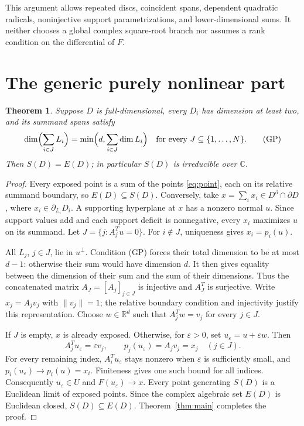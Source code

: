\documentclass[11pt]{article}
\newtheorem{theorem}{Theorem}
\newcommand{\R}{\mathbb R}
\newcommand{\C}{\mathbb C}
\begin{document}
This argument allows repeated discs, coincident spans, dependent
quadratic radicals, noninjective support parametrizations, and
lower-dimensional sums. It neither chooses a global complex
square-root branch nor assumes a rank condition on the differential
of \(F\).

\section{The generic purely nonlinear part}\label{sec:generic}

\begin{theorem}\label{thm:generic}
Suppose \(D\) is full-dimensional, every \(D_i\) has dimension at
least two, and its summand spans satisfy
\begin{equation}\label{eq:GP}
 \dim\Bigl(\sum_{i\in J}L_i\Bigr)
 =\min\Bigl(d,\sum_{i\in J}\dim L_i\Bigr)
 \quad\text{for every }J\subseteq\{1,\ldots,N\}.
 \tag{GP}
\end{equation}
Then \(S(D)=E(D)\); in particular \(S(D)\) is irreducible over \(\C\).
\end{theorem}
\begin{proof}
Every exposed point is a sum of the points \eqref{eq:point}, each on
its relative summand boundary, so \(E(D)\subseteq S(D)\).
Conversely, take \(x=\sum_i x_i\in D^\partial\cap\partial D\), where
\(x_i\in\partial_{L_i}D_i\). A supporting hyperplane at \(x\) has a
nonzero normal \(u\). Since support values add and each support deficit
is nonnegative, every \(x_i\) maximizes \(u\) on its summand.
Let \(J=\{j:A_j^Tu=0\}\). For \(i\notin J\), uniqueness gives
\(x_i=p_i(u)\).

All \(L_j\), \(j\in J\), lie in \(u^\perp\). Condition (GP) forces
their total dimension to be at most \(d-1\): otherwise their sum would
have dimension \(d\). It then gives equality between the dimension of
their sum and the sum of their dimensions. Thus the concatenated
matrix \(A_J=[A_j]_{j\in J}\) is injective and \(A_J^T\) is surjective.
Write \(x_j=A_jv_j\) with \(\|v_j\|=1\); the relative boundary
condition and injectivity justify this representation. Choose
\(w\in\R^d\) such that \(A_j^Tw=v_j\) for every \(j\in J\).

If \(J\) is empty, \(x\) is already exposed. Otherwise, for
\(\varepsilon>0\), set \(u_\varepsilon=u+\varepsilon w\). Then
\[
 A_j^Tu_\varepsilon=\varepsilon v_j,
 \qquad p_j(u_\varepsilon)=A_jv_j=x_j\quad(j\in J).
\]
For every remaining index, \(A_i^Tu_\varepsilon\) stays nonzero when
\(\varepsilon\) is sufficiently small, and
\(p_i(u_\varepsilon)\to p_i(u)=x_i\). Finiteness gives one such bound
for all indices. Consequently \(u_\varepsilon\in U\) and
\(F(u_\varepsilon)\to x\). Every point generating \(S(D)\) is a
Euclidean limit of exposed points. Since the complex algebraic set
\(E(D)\) is Euclidean closed, \(S(D)\subseteq E(D)\).
Theorem~\ref{thm:main} completes the proof.
\end{proof}
\end{document}

